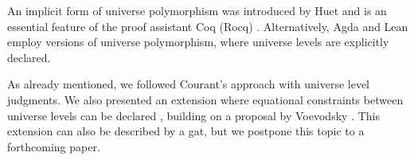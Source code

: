 \documentclass[11pt,a4paper]{article}
\theoremstyle{plain}
\theoremstyle{definition}
\newcommand{\level}{\mathsf{level}}
\def\Sigmaext{{\Sigma^\mathrm{ext}}}
\def\Sigmaint{{\Sigma^\mathrm{up}}}
\begin{document}
An implicit form of universe polymorphism was introduced by Huet \cite{Huet87} and is an essential feature of the proof assistant Coq (Rocq) \cite{coq:general}. Alternatively, Agda \cite{agda-wiki} and Lean \cite{moura:lean} employ versions of universe polymorphism, where universe levels are explicitly declared.

As already mentioned, we followed Courant's approach \cite{Courant02} with universe level judgments. We also presented an extension where equational constraints between universe levels can be declared \cite{BezemCDE22}, building on a proposal by Voevodsky \cite{VV}. This extension can also be described by a gat, but we postpone this topic to a forthcoming paper.


%
%
\end{document}
